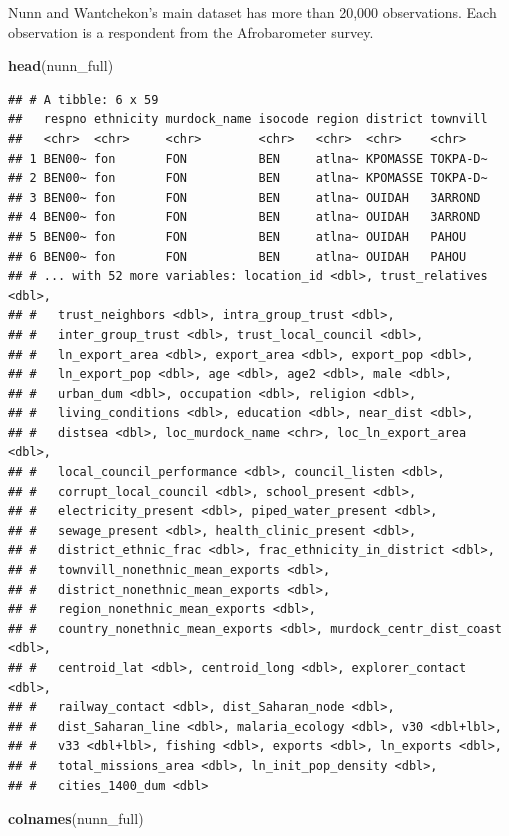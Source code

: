 \documentclass[]{book}
\newenvironment{Shaded}{\begin{snugshade}}{\end{snugshade}}
\newcommand{\KeywordTok}[1]{\textcolor[rgb]{0.13,0.29,0.53}{\textbf{#1}}}
\newcommand{\NormalTok}[1]{#1}
\theoremstyle{definition}
\theoremstyle{definition}
\theoremstyle{definition}
\theoremstyle{remark}
\begin{document}
Nunn and Wantchekon's main dataset has more than 20,000 observations. Each observation is a respondent from the Afrobarometer survey.

\begin{Shaded}
\begin{Highlighting}[]
\KeywordTok{head}\NormalTok{(nunn_full)}
\end{Highlighting}
\end{Shaded}

\begin{verbatim}
## # A tibble: 6 x 59
##   respno ethnicity murdock_name isocode region district townvill
##   <chr>  <chr>     <chr>        <chr>   <chr>  <chr>    <chr>   
## 1 BEN00~ fon       FON          BEN     atlna~ KPOMASSE TOKPA-D~
## 2 BEN00~ fon       FON          BEN     atlna~ KPOMASSE TOKPA-D~
## 3 BEN00~ fon       FON          BEN     atlna~ OUIDAH   3ARROND 
## 4 BEN00~ fon       FON          BEN     atlna~ OUIDAH   3ARROND 
## 5 BEN00~ fon       FON          BEN     atlna~ OUIDAH   PAHOU   
## 6 BEN00~ fon       FON          BEN     atlna~ OUIDAH   PAHOU   
## # ... with 52 more variables: location_id <dbl>, trust_relatives <dbl>,
## #   trust_neighbors <dbl>, intra_group_trust <dbl>,
## #   inter_group_trust <dbl>, trust_local_council <dbl>,
## #   ln_export_area <dbl>, export_area <dbl>, export_pop <dbl>,
## #   ln_export_pop <dbl>, age <dbl>, age2 <dbl>, male <dbl>,
## #   urban_dum <dbl>, occupation <dbl>, religion <dbl>,
## #   living_conditions <dbl>, education <dbl>, near_dist <dbl>,
## #   distsea <dbl>, loc_murdock_name <chr>, loc_ln_export_area <dbl>,
## #   local_council_performance <dbl>, council_listen <dbl>,
## #   corrupt_local_council <dbl>, school_present <dbl>,
## #   electricity_present <dbl>, piped_water_present <dbl>,
## #   sewage_present <dbl>, health_clinic_present <dbl>,
## #   district_ethnic_frac <dbl>, frac_ethnicity_in_district <dbl>,
## #   townvill_nonethnic_mean_exports <dbl>,
## #   district_nonethnic_mean_exports <dbl>,
## #   region_nonethnic_mean_exports <dbl>,
## #   country_nonethnic_mean_exports <dbl>, murdock_centr_dist_coast <dbl>,
## #   centroid_lat <dbl>, centroid_long <dbl>, explorer_contact <dbl>,
## #   railway_contact <dbl>, dist_Saharan_node <dbl>,
## #   dist_Saharan_line <dbl>, malaria_ecology <dbl>, v30 <dbl+lbl>,
## #   v33 <dbl+lbl>, fishing <dbl>, exports <dbl>, ln_exports <dbl>,
## #   total_missions_area <dbl>, ln_init_pop_density <dbl>,
## #   cities_1400_dum <dbl>
\end{verbatim}

\begin{Shaded}
\begin{Highlighting}[]
\KeywordTok{colnames}\NormalTok{(nunn_full)}
\end{Highlighting}
\end{Shaded}
\end{document}

